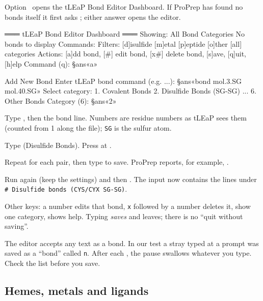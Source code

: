 Option~ opens the \textsf{tLEaP Bond Editor Dashboard}. If ProPrep has
found no bonds itself it first asks ; either answer opens the editor.

\begin{screen}
═══ tLEaP Bond Editor Dashboard ═══
Showing: All Bond Categories
No bonds to display
Commands:
Filters: [d]isulfide [m]etal [p]eptide [o]ther [all] categories
Actions: [a]dd bond, [#] edit bond, [x#] delete bond, [s]ave, [q]uit, [h]elp
Command (q): §ans«a»

Add New Bond
Enter tLEaP bond command (e.g. ...): §ans«bond mol.3.SG mol.40.SG»
Select category:
  1. Covalent Bonds
  2. Disulfide Bonds (SG-SG)
...
  6. Other Bonds
Category (6): §ans«2»
\end{screen}

\begin{steps}
  \item Type , then the bond line. Numbers are residue numbers as tLEaP
        sees them (counted from 1 along the file); \texttt{SG} is the sulfur
        atom.
  \item Type  (Disulfide Bonds). Press  at .
  \item Repeat for each pair, then type  to save. ProPrep reports, for
        example, .
  \item Run  again (keep the settings) and then . The input
        now contains the lines under \texttt{\# Disulfide bonds (CYS/CYX
        SG-SG)}.
\end{steps}

Other keys: a number edits that bond, \texttt{x} followed by a number deletes
it,     show one category,  shows help.
Typing  \emph{saves} and leaves; there is no ``quit without saving''.

\begin{watchout}
The editor accepts any text as a bond. In our test a stray  typed at
a prompt was saved as a ``bond'' called \texttt{n}. After each , the
pause  swallows whatever you type. Check the
list before you save.
\end{watchout}

\subsection{Hemes, metals and ligands}\label{sec:topology-special}

